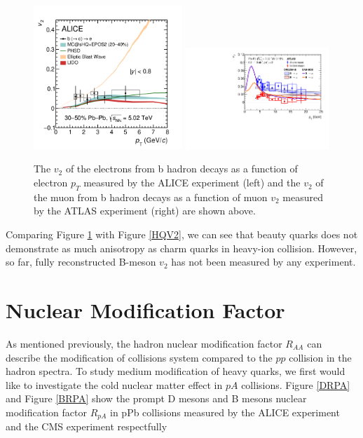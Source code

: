 \begin{figure}[hbtp]
\begin{center}
\includegraphics[width=0.50\textwidth]{Figures/Chapter2/ALICENPEv2.png}
\includegraphics[width=0.485\textwidth]{Figures/Chapter2/ATLASNPMUv2.png}
\caption{The $v_2$ of the electrons from b hadron decays as a function of electron $p_T$ measured by the ALICE experiment (left) and the $v_2$ of the muon from b hadron decays as a function of muon $v_2$ measured by the ATLAS experiment (right) are shown above.}
\label{BeautyEV2}
\end{center}
\end{figure}   


Comparing Figure \ref{BeautyEV2} with Figure \ref{HQV2}, we can see that beauty quarks does not demonstrate as much anisotropy as charm quarks in heavy-ion collision. However, so far, fully reconstructed B-meson $v_2$ has not been measured by any experiment. 


\clearpage

\section{Nuclear Modification Factor}

As mentioned previously, the hadron nuclear modification factor $R_{AA}$ can describe the modification of collisions system compared to the $pp$ collision in the hadron spectra. To study medium modification of heavy quarks, we first would like to investigate the cold nuclear matter effect in $pA$ collisions. Figure \ref{DRPA} and Figure \ref{BRPA} show the prompt D mesons and B mesons nuclear modification factor $R_{pA}$ in pPb collisions measured by the ALICE experiment \cite{ALICEDRPARef} and the CMS experiment \cite{CMSBRPARef} respectfully 



